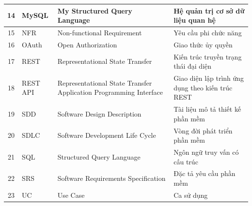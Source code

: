 \documentclass[a4paper,11pt,oneside]{book}
\begin{document}
\begin{table}[H]
\begin{tabular}{|c|p{1.3cm}|p{5.5cm}|p{5.0cm}|}
			14 & MySQL & My Structured Query Language
			& Hệ quản trị cơ sở dữ liệu quan hệ \\
			\hline
			
			15 & NFR & Non-functional Requirement
			& Yêu cầu phi chức năng \\
			\hline
			
			16 & OAuth & Open Authorization
			& Giao thức ủy quyền \\
			\hline
			
			17 & REST & Representational State Transfer
			& Kiến trúc truyền trạng thái đại diện \\
			\hline
			
			18 & REST API & Representational State Transfer Application Programming Interface
			& Giao diện lập trình ứng dụng theo kiến trúc REST \\
			\hline
			
			19 & SDD & Software Design Description
			& Tài liệu mô tả thiết kế phần mềm \\
			\hline
			
			20 & SDLC & Software Development Life Cycle
			& Vòng đời phát triển phần mềm \\
			\hline
			
			21 & SQL & Structured Query Language
			& Ngôn ngữ truy vấn có cấu trúc \\
			\hline
			
			22 & SRS & Software Requirements Specification
			& Đặc tả yêu cầu phần mềm \\
			\hline
			
			23 & UC & Use Case
			& Ca sử dụng \\
			\hline
			
		\end{tabular}
	\end{table}
	
	\clearpage
	
	
	\listoffigures
	
	\clearpage
	
	
	\listoftables
	
	\clearpage
	
	
\end{document}
